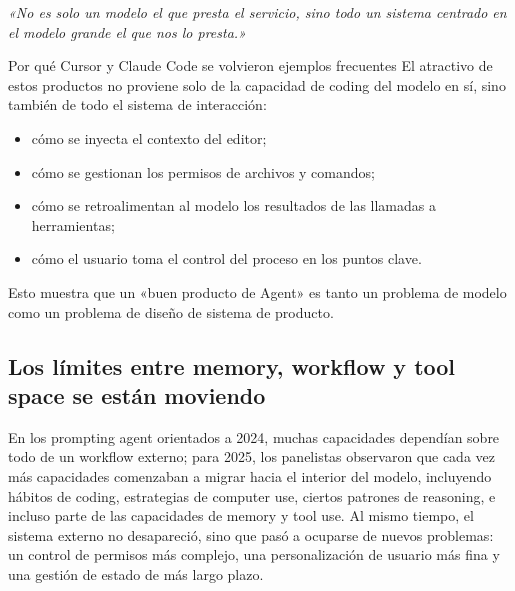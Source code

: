 \documentclass[a4paper]{article}
\begin{document}
\textit{«No es solo un modelo el que presta el servicio, sino todo un sistema centrado en el modelo grande el que nos lo presta.»}

\begin{importantbox}{Por qué Cursor y Claude Code se volvieron ejemplos frecuentes}
El atractivo de estos productos no proviene solo de la capacidad de coding del modelo en sí, sino también de todo el sistema de interacción:
\begin{itemize}
  \item cómo se inyecta el contexto del editor;
  \item cómo se gestionan los permisos de archivos y comandos;
  \item cómo se retroalimentan al modelo los resultados de las llamadas a herramientas;
  \item cómo el usuario toma el control del proceso en los puntos clave.
\end{itemize}
Esto muestra que un «buen producto de Agent» es tanto un problema de modelo como un problema de diseño de sistema de producto.
\end{importantbox}

\subsection{Los límites entre memory, workflow y tool space se están moviendo}
En los prompting agent orientados a 2024, muchas capacidades dependían sobre todo de un workflow externo; para 2025, los panelistas observaron que cada vez más capacidades comenzaban a migrar hacia el interior del modelo, incluyendo hábitos de coding, estrategias de computer use, ciertos patrones de reasoning, e incluso parte de las capacidades de memory y tool use. Al mismo tiempo, el sistema externo no desapareció, sino que pasó a ocuparse de nuevos problemas: un control de permisos más complejo, una personalización de usuario más fina y una gestión de estado de más largo plazo.
\end{document}
